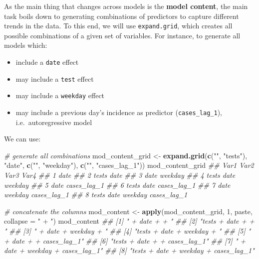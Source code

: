 \documentclass[]{book}
\newenvironment{Shaded}{\begin{snugshade}}{\end{snugshade}}
\newcommand{\CommentTok}[1]{\textcolor[rgb]{0.56,0.35,0.01}{\textit{#1}}}
\newcommand{\DataTypeTok}[1]{\textcolor[rgb]{0.13,0.29,0.53}{#1}}
\newcommand{\DecValTok}[1]{\textcolor[rgb]{0.00,0.00,0.81}{#1}}
\newcommand{\KeywordTok}[1]{\textcolor[rgb]{0.13,0.29,0.53}{\textbf{#1}}}
\newcommand{\NormalTok}[1]{#1}
\newcommand{\StringTok}[1]{\textcolor[rgb]{0.31,0.60,0.02}{#1}}
\providecommand{\tightlist}{%
  \setlength{\itemsep}{0pt}\setlength{\parskip}{0pt}}
\begin{document}
As the main thing that changes across models is the \textbf{model content}, the main
task boils down to generating combinations of predictors to capture different
trends in the data. To this end, we will use \texttt{expand.grid}, which creates all
possible combinations of a given set of variables. For instance, to generate all
models which:

\begin{itemize}
\tightlist
\item
  include a \texttt{date} effect
\item
  may include a \texttt{test} effect
\item
  may include a \texttt{weekday} effect
\item
  may include a previous day's incidence as predictor (\texttt{cases\_lag\_1}),
  i.e.~autoregressive model
\end{itemize}

We can use:

\begin{Shaded}
\begin{Highlighting}[]

\CommentTok{# generate all combinations}
\NormalTok{mod_content_grid <-}\StringTok{ }\KeywordTok{expand.grid}\NormalTok{(}\KeywordTok{c}\NormalTok{(}\StringTok{""}\NormalTok{, }\StringTok{"tests"}\NormalTok{),}
                                \StringTok{"date"}\NormalTok{,}
                                \KeywordTok{c}\NormalTok{(}\StringTok{""}\NormalTok{, }\StringTok{"weekday"}\NormalTok{),}
                                \KeywordTok{c}\NormalTok{(}\StringTok{""}\NormalTok{, }\StringTok{"cases_lag_1"}\NormalTok{))}
\NormalTok{mod_content_grid}
\CommentTok{##    Var1 Var2    Var3        Var4}
\CommentTok{## 1       date                    }
\CommentTok{## 2 tests date                    }
\CommentTok{## 3       date weekday            }
\CommentTok{## 4 tests date weekday            }
\CommentTok{## 5       date         cases_lag_1}
\CommentTok{## 6 tests date         cases_lag_1}
\CommentTok{## 7       date weekday cases_lag_1}
\CommentTok{## 8 tests date weekday cases_lag_1}

\CommentTok{# concatenate the columns}
\NormalTok{mod_content <-}\StringTok{ }\KeywordTok{apply}\NormalTok{(mod_content_grid, }\DecValTok{1}\NormalTok{, paste, }\DataTypeTok{collapse =} \StringTok{" + "}\NormalTok{)}
\NormalTok{mod_content}
\CommentTok{## [1] " + date +  + "                       }
\CommentTok{## [2] "tests + date +  + "                  }
\CommentTok{## [3] " + date + weekday + "                }
\CommentTok{## [4] "tests + date + weekday + "           }
\CommentTok{## [5] " + date +  + cases_lag_1"            }
\CommentTok{## [6] "tests + date +  + cases_lag_1"       }
\CommentTok{## [7] " + date + weekday + cases_lag_1"     }
\CommentTok{## [8] "tests + date + weekday + cases_lag_1"}
\end{Highlighting}
\end{Shaded}
\end{document}
